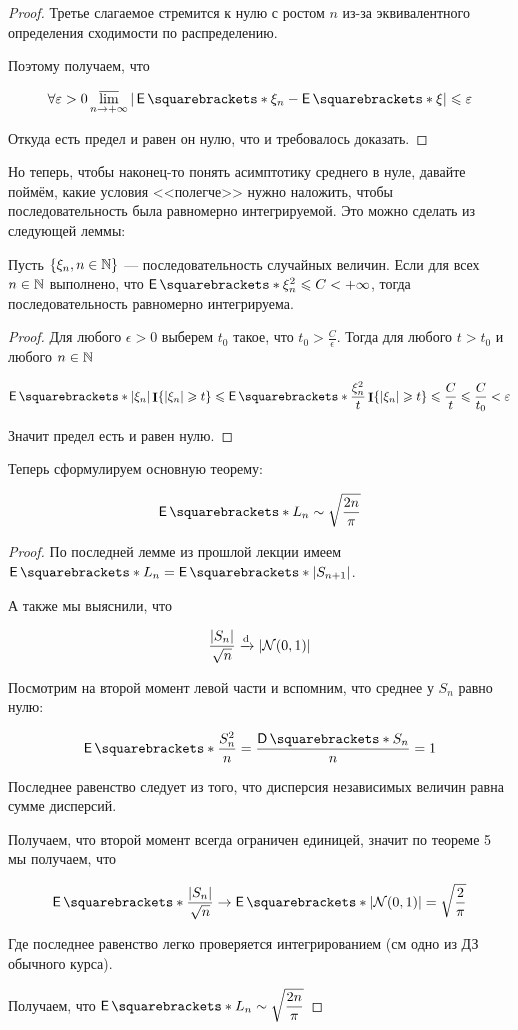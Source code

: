 \begin{proof}
  Третье слагаемое стремится к нулю с ростом $n$ из-за эквивалентного определения
  сходимости по распределению.

  Поэтому получаем, что

  \[
    \forall \epsilon > 0 \varlimsup\limits_{n \to +\infty} |\E{\xi_n} - \E{\xi}| \leq \epsilon
  \]

  Откуда есть предел и равен он нулю, что и требовалось доказать.
\end{proof}


Но теперь, чтобы наконец-то понять асимптотику среднего в нуле, давайте
поймём, какие условия <<полегче>> нужно наложить, чтобы последовательность
была равномерно интегрируемой. Это можно сделать из следующей леммы:

\begin{lemma}
  Пусть $\{\xi_n, n \in \mathbb{N}\}$ --- последовательность случайных величин. Если
  для всех $n \in \mathbb{N}$ выполнено, что $\E{\xi_n^2} \leq C < +\infty$, тогда
  последовательность равномерно интегрируема.
\end{lemma}

\begin{proof}
  Для любого $\epsilon > 0$ выберем $t_0$ такое, что $t_0 > \frac{C}{\epsilon}$.
  Тогда для любого $t > t_0$ и любого $n \in \mathbb{N}$

  \[
    \E{|\xi_n|\I\{|\xi_n| \geq t\}} \leq \E{\frac{\xi_n^2}{t}\I\{|\xi_n| \geq t\}}
    \leq \frac{C}{t} \leq \frac{C}{t_0} < \epsilon
  \]

  Значит предел есть и равен нулю.
\end{proof}

Теперь сформулируем основную теорему:

\begin{theorem}
  \[
    \E{L_n} \sim \sqrt{\frac{2n}{\pi}}
  \]
\end{theorem}

\begin{proof}
  По последней лемме из прошлой лекции имеем $\E{L_n} = \E{|S_{n + 1}|}$.

  А также мы выяснили, что

  \[
    \frac{|S_n|}{\sqrt{n}} \xrightarrow{\mathrm{d}} |\mathcal{N}(0, 1)|
  \]

  Посмотрим на второй момент левой части и вспомним, что среднее у $S_n$ равно
  нулю:

  \[
    \E{\frac{S_n^2}{n}} = \frac{\D{S_n}}{n} = 1
  \]

  Последнее равенство следует из того, что дисперсия независимых величин равна
  сумме дисперсий.

  Получаем, что второй момент всегда ограничен единицей, значит по теореме 5
  мы получаем, что

  \[
    \E{\frac{|S_n|}{\sqrt{n}}} \to \E{|\mathcal{N}(0, 1)|} = \sqrt{\frac{2}{\pi}}
  \]

  Где последнее равенство легко проверяется интегрированием (см одно из ДЗ обычного
  курса).

  Получаем, что $\E{L_n} \sim \sqrt{\dfrac{2n}{\pi}}$
\end{proof}

